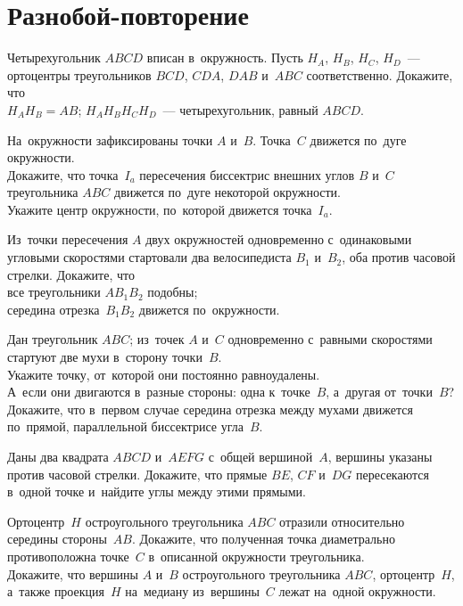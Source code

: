 
\section*{Разнобой-повторение}


\begin{problems}

\item
Четырехугольник $ABCD$ вписан в~окружность.
Пусть $H_A$, $H_B$, $H_C$, $H_D$~--- ортоцентры треугольников
$BCD$, $CDA$, $DAB$ и~$ABC$ соответственно.
Докажите, что
\\
\subproblem $H_A H_B = AB$;
\quad
\subproblem $H_A H_B H_C H_D$~--- четырехугольник, равный $ABCD$.

\item
На~окружности зафиксированы точки $A$ и~$B$.
Точка~$C$ движется по~дуге окружности.
\\
\subproblem
Докажите, что точка~$I_a$ пересечения биссектрис внешних углов $B$ и~$C$
треугольника $ABC$ движется по~дуге некоторой окружности.
\\
\subproblem
Укажите центр окружности, по~которой движется точка~$I_a$.

\item
Из~точки пересечения $A$ двух окружностей одновременно с~одинаковыми угловыми
скоростями стартовали два велосипедиста $B_1$ и~$B_2$, оба против часовой
стрелки.
Докажите, что
\\
\subproblem все треугольники $A B_1 B_2$ подобны;
\\
\subproblem середина отрезка~$B_1 B_2$ движется по~окружности.

\item
Дан треугольник $ABC$;
из~точек $A$ и~$C$ одновременно с~равными скоростями стартуют две мухи
в~сторону точки~$B$.
\\
\subproblem
Укажите точку, от~которой они постоянно равноудалены.
\\
\subproblem
А~если они двигаются в~разные стороны: одна к~точке~$B$, а~другая от~точки~$B$?
\\
\subproblem
Докажите, что в~первом случае середина отрезка между мухами движется по~прямой,
параллельной биссектрисе угла~$B$.

\item
Даны два квадрата $ABCD$ и~$AEFG$ с~общей вершиной~$A$, вершины указаны против
часовой стрелки.
Докажите, что прямые $BE$, $CF$ и~$DG$ пересекаются в~одной точке и~найдите
углы между этими прямыми.

\item
\subproblem
Ортоцентр~$H$ остроугольного треугольника $ABC$ отразили относительно середины
стороны~$AB$.
Докажите, что полученная точка диаметрально противоположна точке~$C$
в~описанной окружности треугольника.
\\
\subproblem
Докажите, что вершины $A$ и~$B$ остроугольного треугольника $ABC$,
ортоцентр~$H$, а~также проекция~$H$ на~медиану из~вершины~$C$ лежат на~одной
окружности.

\end{problems}

